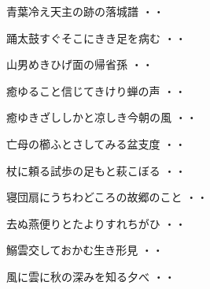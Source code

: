 \vspace{0.6cm}
\begin{shiika}青葉冷え天主の跡の落城譜
\hfill{・・}\end{shiika}
\vspace{0.6cm}
\begin{shiika}踊太鼓すぐそこにきき足を病む
\hfill{・・}\end{shiika}
\vspace{0.6cm}
\begin{shiika}山男めきひげ面の帰省孫
\hfill{・・}\end{shiika}
\vspace{0.6cm}
\begin{shiika}癒ゆること信じてきけり蝉の声
\hfill{・・}\end{shiika}
\vspace{0.6cm}
\begin{shiika}癒ゆきざししかと凉しき今朝の風
\hfill{・・}\end{shiika}
\vspace{0.6cm}
\begin{shiika}亡母の櫛ふとさしてみる盆支度
\hfill{・・}\end{shiika}
\vspace{0.6cm}
\begin{shiika}杖に頼る試歩の足もと萩こぼる
\hfill{・・}\end{shiika}
\vspace{0.6cm}
\begin{shiika}寝団扇にうちわどころの故郷のこと
\hfill{・・}\end{shiika}
\vspace{0.6cm}
\begin{shiika}去ぬ燕便りとたよりすれちがひ
\hfill{・・}\end{shiika}
\vspace{0.6cm}
\begin{shiika}鰯雲交しておかむ生き形見
\hfill{・・}\end{shiika}
\vspace{0.6cm}
\begin{shiika}風に雲に秋の深みを知る夕べ
\hfill{・・}\end{shiika}
